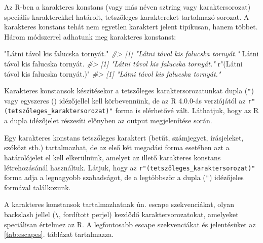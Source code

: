 \documentclass[
]{book}
\newenvironment{Shaded}{\begin{snugshade}}{\end{snugshade}}
\newcommand{\CommentTok}[1]{\textcolor[rgb]{0.56,0.35,0.01}{\textit{#1}}}
\newcommand{\NormalTok}[1]{#1}
\newcommand{\StringTok}[1]{\textcolor[rgb]{0.31,0.60,0.02}{#1}}
\begin{document}
Az R-ben a karakteres konstans (vagy más néven sztring vagy karaktersorozat) speciális karakterekkel határolt, tetszőleges karaktereket tartalmazó sorozat. A karakteres konstans tehát nem egyetlen karaktert jelent tipikusan, hanem többet. Három módszerrel adhatunk meg karakteres konstanst:

\begin{Shaded}
\begin{Highlighting}[]
\StringTok{"Látni távol kis falucska tornyát."}
\CommentTok{\#\textgreater{} [1] "Látni távol kis falucska tornyát."}
\StringTok{\textquotesingle{}Látni távol kis falucska tornyát.\textquotesingle{}}
\CommentTok{\#\textgreater{} [1] "Látni távol kis falucska tornyát."}
\NormalTok{r}\StringTok{"(Látni távol kis falucska tornyát.)"}
\CommentTok{\#\textgreater{} [1] "Látni távol kis falucska tornyát."}
\end{Highlighting}
\end{Shaded}

Karakteres konstansok készítésekor a tetszőleges karaktersorozatunkat dupla (\texttt{"}) vagy egyszeres (\texttt{\textquotesingle{}}) idézőjellel kell körbevennünk, de az R 4.0.0-ás verziójától az \texttt{r"(tetszőleges\_karaktersorozat)"} forma is elérhetővé vált. Láthatjuk, hogy az R a dupla idézőjelet részesíti előnyben az output megjelenítése során.

Egy karakteres konstans tetszőleges karaktert (betűt, számjegyet, írásjeleket, szóközt stb.) tartalmazhat, de az első két megadási forma esetében azt a határolójelet el kell elkerülnünk, amelyet az illető karakteres konstans létrehozásánál használtuk. Látjuk, hogy az \texttt{r"(tetszőleges\_karaktersorozat)"} forma adja a legnagyobb szabadságot, de a legtöbbször a dupla (\texttt{"}) idézőjeles formával találkozunk.

A karakteres konstansok tartalmazhatnak ún. escape szekvenciákat, olyan backslash jellel (\texttt{\textbackslash{}}, fordított perjel) kezdődő karaktersorozatokat, amelyeket speciálisan értelmez az R. A legfontosabb escape szekvenciákat és jelentésüket az \ref{tab:escapes}. táblázat tartalmazza.
\end{document}
